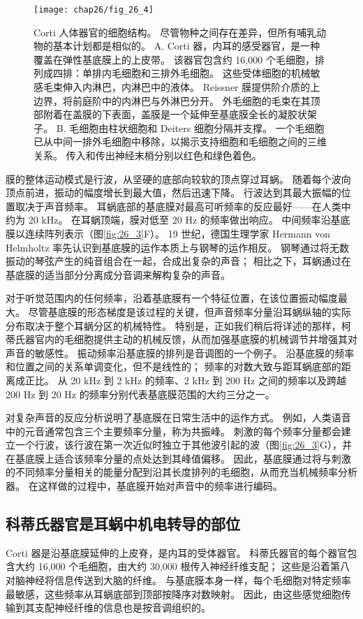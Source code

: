 \begin{figure}[htbp]
	\centering
	\texttt{[image: chap26/fig\_26\_4]}
	\caption{Corti 人体器官的细胞结构。 尽管物种之间存在差异，但所有哺乳动物的基本计划都是相似的。 
		A. Corti 器，内耳的感受器官，是一种覆盖在弹性基底膜上的上皮带。 
		该器官包含约 16,000 个毛细胞，排列成四排：单排内毛细胞和三排外毛细胞。 
		这些受体细胞的机械敏感毛束伸入内淋巴，内淋巴中的液体。 
		Reissner 膜提供阶介质的上边界，将前庭阶中的内淋巴与外淋巴分开。 
		外毛细胞的毛束在其顶部附着在盖膜的下表面，盖膜是一个延伸至基底膜全长的凝胶状架子。 
		B. 毛细胞由柱状细胞和 Deiters 细胞分隔并支撑。 
		一个毛细胞已从中间一排外毛细胞中移除，以揭示支持细胞和毛细胞之间的三维关系。 
		传入和传出神经末梢分别以红色和绿色着色。}
	\label{fig:26_4}
\end{figure}


膜的整体运动模式是行波，从坚硬的底部向较软的顶点穿过耳蜗。 
随着每个波向顶点前进，振动的幅度增长到最大值，然后迅速下降。 
行波达到其最大振幅的位置取决于声音频率。 
耳蜗底部的基底膜对最高可听频率的反应最好——在人类中约为 20 kHz。 
在耳蜗顶端，膜对低至 20 Hz 的频率做出响应。 
中间频率沿基底膜以连续阵列表示（图\ref{fig:26_3}F）。 
19 世纪，德国生理学家 Hermann von Helmholtz 率先认识到基底膜的运作本质上与钢琴的运作相反。 
钢琴通过将无数振动的琴弦产生的纯音组合在一起，合成出复杂的声音； 相比之下，耳蜗通过在基底膜的适当部分分离成分音调来解构复杂的声音。


对于听觉范围内的任何频率，沿着基底膜有一个特征位置，在该位置振动幅度最大。 
尽管基底膜的形态梯度是该过程的关键，但声音频率分量沿耳蜗纵轴的实际分布取决于整个耳蜗分区的机械特性。
特别是，正如我们稍后将详述的那样，柯蒂氏器官内的毛细胞提供主动的机械反馈，从而加强基底膜的机械调节并增强其对声音的敏感性。 
振动频率沿基底膜的排列是音调图的一个例子。 
沿基底膜的频率和位置之间的关系单调变化，但不是线性的； 频率的对数大致与距耳蜗底部的距离成正比。 
从 20 kHz 到 2 kHz 的频率、2 kHz 到 200 Hz 之间的频率以及跨越 200 Hz 到 20 Hz 的频率分别代表基底膜范围的大约三分之一。


对复杂声音的反应分析说明了基底膜在日常生活中的运作方式。 
例如，人类语音中的元音通常包含三个主要频率分量，称为共振峰。 
刺激的每个频率分量都会建立一个行波，该行波在第一次近似时独立于其他波引起的波（图\ref{fig:26_3}G），并在基底膜上适合该频率分量的点处达到其峰值偏移。 
因此，基底膜通过将与刺激的不同频率分量相关的能量分配到沿其长度排列的毛细胞，从而充当机械频率分析器。
在这样做的过程中，基底膜开始对声音中的频率进行编码。


\subsection{科蒂氏器官是耳蜗中机电转导的部位}
Corti 器是沿基底膜延伸的上皮脊，是内耳的受体器官。 
科蒂氏器官的每个器官包含大约 16,000 个毛细胞，由大约 30,000 根传入神经纤维支配； 这些是沿着第八对脑神经将信息传送到大脑的纤维。 
与基底膜本身一样，每个毛细胞对特定频率最敏感，这些频率从耳蜗底部到顶部按降序对数映射。 
因此，由这些感觉细胞传输到其支配神经纤维的信息也是按音调组织的。


